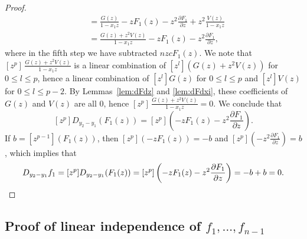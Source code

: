 \documentclass{amsart}
\numberwithin{equation}{section}
\theoremstyle{definition}
\begin{document}
\begin{proof}
\begin{align*}
&=\frac{G(z)}{1-x_1z}-zF_1(z)-z^2\frac{\partial F_1}{\partial z}+z^2\frac{V(z)}{1-x_1z}\\
&=\frac{G(z)+z^2V(z)}{1-x_1z}-zF_1(z)-z^2\frac{\partial F_1}{\partial z},
\end{align*}
where in the fifth step we have subtracted $n zc F_1(z)$.  We note that $[z^p]\,\frac{G(z)+z^2V(z)}{1-x_1z}$ is a linear combination of $[z^l](G(z)+z^2V(z))$ for $0 \le l \le p$, hence a linear combination of $[z^l]G(z)$ for $0 \le l \le p$ and $[z^l]V(z)$ for $0 \le l \le p-2$. By Lemmas~\ref{lem:dFdz} and \ref{lem:dFdxi}, these coefficients of $G(z)$ and $V(z)$ are all $0$, hence $[z^p]\,\frac{G(z)+z^2V(z)}{1-x_1z}=0$. We conclude that 
\[
[z^p]D_{y_2-y_1}(F_1(z))=[z^p]\left(-zF_1(z)-z^2\frac{\partial F_1}{\partial z}\right).
\]
If $b=[z^{p-1}](F_1(z))$, then $[z^p](-zF_1(z))=-b$ and $[z^p]\left(-z^2\frac{\partial F_1}{\partial z}\right)=b$, which implies that 
\[
D_{y_2 - y_1} f_1 = [z^p]D_{y_2-y_1}(F_1(z))= [z^p]\left(-zF_1(z)-z^2\frac{\partial F_1}{\partial z}\right) = -b + b = 0. \qedhere
\]
\end{proof}

\subsection{Proof of linear independence of $f_1, \ldots, f_{n-1}$}
\end{document}
